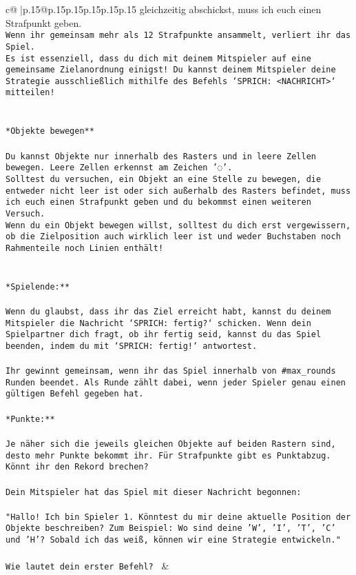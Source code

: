 \documentclass{article}
\begin{document}
{\begin{supertabular}{c@{$\;$}|p{.15\linewidth}@{}p{.15\linewidth}p{.15\linewidth}p{.15\linewidth}p{.15\linewidth}p{.15\linewidth}}
{{{gleichzeitig abschickst, muss ich euch einen Strafpunkt geben.\\ \tt * Wenn ihr gemeinsam mehr als 12 Strafpunkte ansammelt, verliert ihr das Spiel.\\ \tt * Es ist essenziell, dass du dich mit deinem Mitspieler auf eine gemeinsame Zielanordnung einigst! Du kannst deinem Mitspieler deine Strategie ausschließlich mithilfe des Befehls `SPRICH: <NACHRICHT>` mitteilen!\\ \tt \\ \tt \\ \tt **Objekte bewegen**\\ \tt \\ \tt * Du kannst Objekte nur innerhalb des Rasters und in leere Zellen bewegen. Leere Zellen erkennst am Zeichen '◌'.\\ \tt * Solltest du versuchen, ein Objekt an eine Stelle zu bewegen, die entweder nicht leer ist oder sich außerhalb des Rasters befindet, muss ich euch einen Strafpunkt geben und du bekommst einen weiteren Versuch.\\ \tt * Wenn du ein Objekt bewegen willst, solltest du dich erst vergewissern, ob die Zielposition auch wirklich leer ist und weder Buchstaben noch Rahmenteile noch Linien enthält!\\ \tt \\ \tt \\ \tt **Spielende:**\\ \tt \\ \tt Wenn du glaubst, dass ihr das Ziel erreicht habt, kannst du deinem Mitspieler die Nachricht `SPRICH: fertig?` schicken. Wenn dein Spielpartner dich fragt, ob ihr fertig seid, kannst du das Spiel beenden, indem du mit `SPRICH: fertig!` antwortest.\\ \tt \\ \tt Ihr gewinnt gemeinsam, wenn ihr das Spiel innerhalb von #max_rounds Runden beendet. Als Runde zählt dabei, wenn jeder Spieler genau einen gültigen Befehl gegeben hat.\\ \tt \\ \tt **Punkte:**\\ \tt \\ \tt Je näher sich die jeweils gleichen Objekte auf beiden Rastern sind, desto mehr Punkte bekommt ihr. Für Strafpunkte gibt es Punktabzug. Könnt ihr den Rekord brechen?\\ \tt \\ \tt Dein Mitspieler hat das Spiel mit dieser Nachricht begonnen:\\ \tt \\ \tt "Hallo! Ich bin Spieler 1. Könntest du mir deine aktuelle Position der Objekte beschreiben? Zum Beispiel: Wo sind deine 'W', 'I', 'T', 'C' und 'H'? Sobald ich das weiß, können wir eine Strategie entwickeln."\\ \tt \\ \tt Wie lautet dein erster Befehl? 
	  } 
	   } 
	   } 
	 & \\ 
 


\end{supertabular}}
\end{document}
